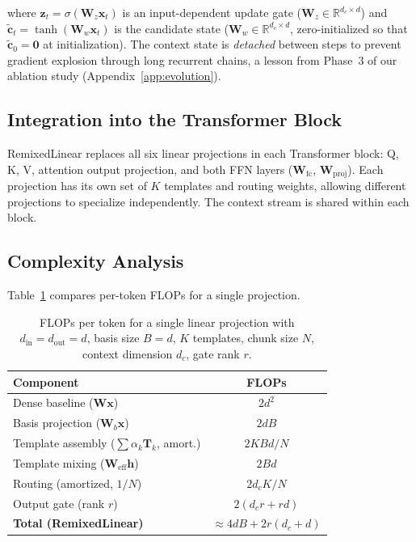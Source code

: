 \documentclass{article}
\begin{document}
\noindent where $\mathbf{z}_t = \sigma(\mathbf{W}_z \mathbf{x}_t)$ is an input-dependent update gate ($\mathbf{W}_z \in \mathbb{R}^{d_c \times d}$) and $\tilde{\mathbf{c}}_t = \tanh(\mathbf{W}_w \mathbf{x}_t)$ is the candidate state ($\mathbf{W}_w \in \mathbb{R}^{d_c \times d}$, zero-initialized so that $\tilde{\mathbf{c}}_0 = \mathbf{0}$ at initialization). The context state is \emph{detached} between steps to prevent gradient explosion through long recurrent chains, a lesson from Phase~3 of our ablation study (Appendix~\ref{app:evolution}).

\subsection{Integration into the Transformer Block}

RemixedLinear replaces all six linear projections in each Transformer block: Q, K, V, attention output projection, and both FFN layers ($\mathbf{W}_\text{fc}$, $\mathbf{W}_\text{proj}$). Each projection has its own set of $K$ templates and routing weights, allowing different projections to specialize independently. The context stream is shared within each block.

\subsection{Complexity Analysis}

Table~\ref{tab:flops} compares per-token FLOPs for a single projection.

\begin{table}[t]
\centering
\small
\caption{FLOPs per token for a single linear projection with $d_\text{in} = d_\text{out} = d$, basis size $B = d$, $K$ templates, chunk size $N$, context dimension $d_c$, gate rank $r$.}
\label{tab:flops}
\begin{tabular}{@{}lc@{}}
\toprule
\textbf{Component} & \textbf{FLOPs} \\
\midrule
Dense baseline ($\mathbf{W}\mathbf{x}$) & $2d^2$ \\
\midrule
Basis projection ($\mathbf{W}_b \mathbf{x}$) & $2dB$ \\
Template assembly ($\sum \alpha_k \mathbf{T}_k$, amort.) & $2KBd/N$ \\
Template mixing ($\mathbf{W}_\text{eff} \mathbf{h}$) & $2Bd$ \\
Routing (amortized, $1/N$) & $2d_c K/N$ \\
Output gate (rank $r$) & $2(d_c r + rd)$ \\
\midrule
\textbf{Total (RemixedLinear)} & $\approx 4dB + 2r(d_c{+}d)$ \\
\bottomrule
\end{tabular}
\end{table}
\end{document}
